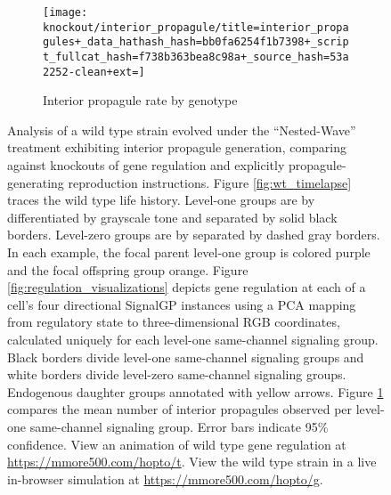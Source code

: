 \begin{figure}[!htbp]
\begin{center}
\begin{minipage}[t]{\linewidth}
\centering
\vspace{0pt} %
\begin{subfigure}[b]{\linewidth}
\texttt{[image: knockout/interior\_propagule/title=interior\_propagules+\_data\_hathash\_hash=bb0fa6254f1b7398+\_script\_fullcat\_hash=f738b363bea8c98a+\_source\_hash=53a2252-clean+ext=]}%
\caption{Interior propagule rate by genotype}
\label{fig:interior_propagule_rate}
\end{subfigure}
\end{minipage}%
\hspace*{\fill}


\caption{
Analysis of a wild type strain evolved under the ``Nested-Wave'' treatment exhibiting interior propagule generation, comparing against knockouts of gene regulation and explicitly propagule-generating reproduction instructions.
Figure \ref{fig:wt_timelapse} traces the wild type life history.
Level-one groups are by differentiated by grayscale tone and separated by solid black borders.
Level-zero groups are by separated by dashed gray borders.
In each example, the focal parent level-one group is colored purple and the focal offspring group orange.
Figure \ref{fig:regulation_visualizations} depicts gene regulation at each of a cell's four directional SignalGP instances using a PCA mapping from regulatory state to three-dimensional RGB coordinates, calculated uniquely for each level-one same-channel signaling group.
Black borders divide level-one same-channel signaling groups and white borders divide level-zero same-channel signaling groups.
Endogenous daughter groups annotated with yellow arrows.
Figure \ref{fig:interior_propagule_rate} compares the mean number of interior propagules observed per level-one same-channel signaling group.
Error bars indicate 95\% confidence.
View an animation of wild type gene regulation at \url{https://mmore500.com/hopto/t}.
View the wild type strain in a live in-browser simulation at \url{https://mmore500.com/hopto/g}.
}
\label{fig:ko-interior_propagule}
\end{center}
\end{figure}
